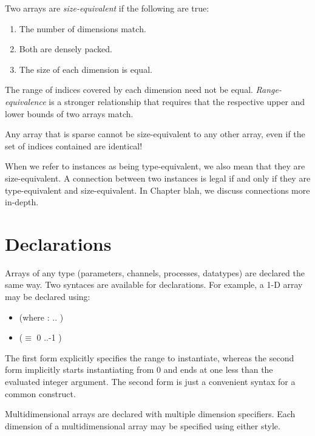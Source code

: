 
Two arrays are \emph{size-equivalent} if the following are true:
\begin{enumerate}
\item The number of dimensions match.
\item Both are densely packed.  
\item The size of each dimension is equal.  
\end{enumerate}

The range of indices covered by each dimension need not be equal.  
\emph{Range-equivalence} is a stronger relationship that 
requires that the respective upper and lower bounds of two arrays match.  

Any array that is sparse cannot be size-equivalent to any other array, 
even if the set of indices contained are identical!  

When we refer to instances as being type-equivalent, 
we also mean that they are size-equivalent.  
A connection between two instances is legal if and only if 
they are type-equivalent and size-equivalent.  
In Chapter blah, we discuss connections more in-depth.  

\section{Declarations}
\label{sec:arrays:declarations}

Arrays of any type (parameters, channels, processes, datatypes) 
are declared the same way.  
Two syntaces are available for declarations. 
For example, a 1-D array may be declared using:
\begin{itemize}
\item {} \ttt{[}  \ttt{]} \hfill
	(where  :  .. )
\item {} \ttt{[}  \ttt{]} \hfill
	($\equiv$  \ttt{[} 0 ..-1 \ttt{]})
\end{itemize}
The first form explicitly specifies the range to instantiate, 
whereas the second form implicitly starts instantiating from 0 and 
ends at one less than the evaluated integer argument.  
The second form is just a convenient syntax for a common construct.  

Multidimensional arrays are declared with multiple dimension specifiers.  
Each dimension of a multidimensional array may be specified using
either style.  

